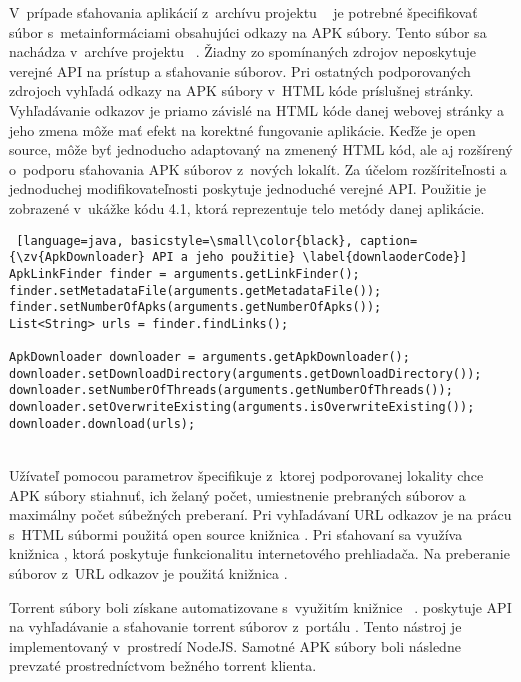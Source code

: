 V~prípade sťahovania aplikácií z~archívu projektu ~\cite{Viennot2014} je potrebné špecifikovať súbor s~metainformáciami obsahujúci odkazy na APK súbory. Tento súbor sa nachádza v~archíve projektu ~\cite{archiveOrg}. Žiadny zo spomínaných zdrojov neposkytuje verejné API na prístup a sťahovanie súborov. Pri ostatných podporovaných zdrojoch  vyhľadá odkazy na APK súbory v~HTML kóde príslušnej stránky. Vyhľadávanie odkazov je priamo závislé na HTML kóde danej webovej stránky a jeho zmena môže mať efekt na korektné fungovanie aplikácie. Keďže je  open source, môže byť jednoducho adaptovaný na zmenený HTML kód, ale aj rozšírený o~podporu sťahovania APK súborov z~nových lokalít. Za účelom rozšíriteľnosti a jednoduchej modifikovateľnosti poskytuje  jednoduché verejné API. Použitie  je zobrazené v~ukážke kódu 4.1, ktorá reprezentuje telo metódy  danej aplikácie. \\
\begin{lstlisting} [language=java, basicstyle=\small\color{black}, caption= {\zv{ApkDownloader} API a jeho použitie} \label{downlaoderCode}]
ApkLinkFinder finder = arguments.getLinkFinder();
finder.setMetadataFile(arguments.getMetadataFile());
finder.setNumberOfApks(arguments.getNumberOfApks());
List<String> urls = finder.findLinks();

ApkDownloader downloader = arguments.getApkDownloader();
downloader.setDownloadDirectory(arguments.getDownloadDirectory());
downloader.setNumberOfThreads(arguments.getNumberOfThreads());
downloader.setOverwriteExisting(arguments.isOverwriteExisting());
downloader.download(urls);
\end{lstlisting}
\mbox{}\\
\noindent Užívateľ pomocou parametrov špecifikuje z~ktorej podporovanej lokality chce APK súbory stiahnuť, ich želaný počet, umiestnenie prebraných súborov a maximálny počet súbežných preberaní. Pri vyhľadávaní URL odkazov je na prácu s~HTML súbormi použitá open source knižnica . Pri sťahovaní sa využíva knižnica , ktorá poskytuje funkcionalitu internetového prehliadača. Na preberanie súborov z~URL odkazov je použitá knižnica . 

Torrent súbory boli získane automatizovane s~využitím knižnice ~\cite{flux}.  poskytuje API na vyhľadávanie a sťahovanie torrent súborov z~portálu . Tento nástroj je implementovaný v~prostredí NodeJS. Samotné APK súbory boli následne prevzaté prostredníctvom bežného torrent klienta.